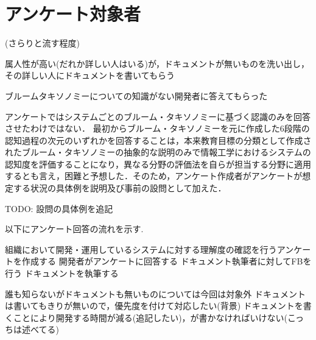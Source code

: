 \section{アンケート対象者}
(さらりと流す程度)

属人性が高い(だれか詳しい人はいる)が，ドキュメントが無いものを洗い出し，その詳しい人にドキュメントを書いてもらう

ブルームタキソノミーについての知識がない開発者に答えてもらった



アンケートではシステムごとのブルーム・タキソノミーに基づく認識のみを回答させたわけではない．
最初からブルーム・タキソノミーを元に作成した6段階の認知過程の次元のいずれかを回答することは，本来教育目標の分類として作成されたブルーム・タキソノミーの抽象的な説明のみで情報工学におけるシステムの認知度を評価することになり，異なる分野の評価法を自らが担当する分野に適用するとも言え，困難と予想した．そのため，アンケート作成者がアンケートが想定する状況の具体例を説明及び事前の設問として加えた．

TODO: 設問の具体例を追記


以下にアンケート回答の流れを示す.

組織において開発・運用しているシステムに対する理解度の確認を行うアンケートを作成する
開発者がアンケートに回答する
ドキュメント執筆者に対してFBを行う
ドキュメントを執筆する

誰も知らないがドキュメントも無いものについては今回は対象外
ドキュメントは書いてもきりが無いので，優先度を付けて対応したい(背景)
ドキュメントを書くことにより開発する時間が減る(追記したい)，が書かなければいけない(こっちは述べてる)
